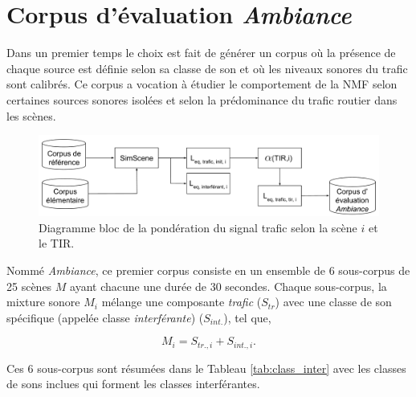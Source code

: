 \section{Corpus d'évaluation \textit{Ambiance}}
\label{part:corpus_ambiance}
Dans un premier temps le choix est fait de générer un corpus où la présence de chaque source est définie selon sa classe de son et où les niveaux sonores du trafic sont calibrés. Ce corpus a vocation à étudier le comportement de la NMF selon certaines sources sonores isolées et selon la prédominance du trafic routier dans les scènes.

\begin{figure}[ht]
\centering
\includegraphics[width=.9\linewidth]{./figures/autres/TIR_ambiance.pdf}
\caption{Diagramme bloc de la pondération du signal trafic selon la scène $i$ et le TIR.}
\label{fig:bloc_diagram_tir}
\end{figure}


Nommé \textit{Ambiance}, ce premier corpus consiste en un ensemble de 6 sous-corpus de 25 scènes $M$ ayant chacune une durée de 30 secondes. Chaque sous-corpus, la mixture sonore $M_i$ mélange une composante \textit{trafic} ($S_{tr}$) avec une classe de son spécifique (appelée classe \textit{interférante}) ($S_{int.}$), tel que,  

\begin{equation}
M_i = S_{tr.,i}+S_{int.,i}.
\end{equation}

Ces 6 sous-corpus sont résumées dans le Tableau \ref{tab:class_inter} avec les classes de sons inclues qui forment les classes interférantes.

